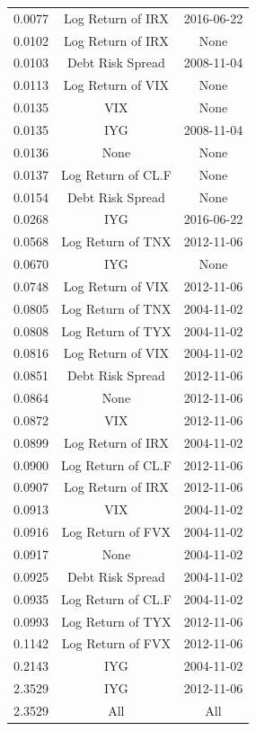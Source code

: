 \documentclass[11pt,3p,review,authoryear]{elsarticle}
\theoremstyle{definition}
\begin{document}
\begin{table}[ht]
\begin{tabular}{ccc}
    0.0077 & Log Return of IRX & 2016-06-22 \\ 
    0.0102 & Log Return of IRX & None \\ 
    0.0103 & Debt Risk Spread & 2008-11-04 \\ 
    0.0113 & Log Return of VIX & None \\ 
    0.0135 & VIX & None \\ 
    0.0135 & IYG & 2008-11-04 \\ 
    \rowcolor{yellow} 0.0136 & None & None \\ 
    0.0137 & Log Return of CL.F & None \\ 
    0.0154 & Debt Risk Spread & None \\ 
    0.0268 & IYG & 2016-06-22 \\
     
    0.0568 & Log Return of TNX & 2012-11-06 \\ 
    0.0670 & IYG & None \\ 
    0.0748 & Log Return of VIX & 2012-11-06 \\ 
    0.0805 & Log Return of TNX & 2004-11-02 \\ 
    0.0808 & Log Return of TYX & 2004-11-02 \\ 
    0.0816 & Log Return of VIX & 2004-11-02 \\ 
    0.0851 & Debt Risk Spread & 2012-11-06 \\ 
    0.0864 & None & 2012-11-06 \\ 
    0.0872 & VIX & 2012-11-06 \\ 
    0.0899 & Log Return of IRX & 2004-11-02 \\ 
    0.0900 & Log Return of CL.F & 2012-11-06 \\ 
    0.0907 & Log Return of IRX & 2012-11-06 \\ 
    0.0913 & VIX & 2004-11-02 \\ 
    0.0916 & Log Return of FVX & 2004-11-02 \\ 
    0.0917 & None & 2004-11-02 \\ 
    0.0925 & Debt Risk Spread & 2004-11-02 \\ 
    0.0935 & Log Return of CL.F & 2004-11-02 \\ 
    0.0993 & Log Return of TYX & 2012-11-06 \\ 
    0.1142 & Log Return of FVX & 2012-11-06 \\ 
    0.2143 & IYG & 2004-11-02 \\ 
    2.3529 & IYG & 2012-11-06 \\ 
    \rowcolor{red} 2.3529 & All & All \\
     \hline
  \end{tabular}
  
  \endgroup
  \end{table}
\end{document}
